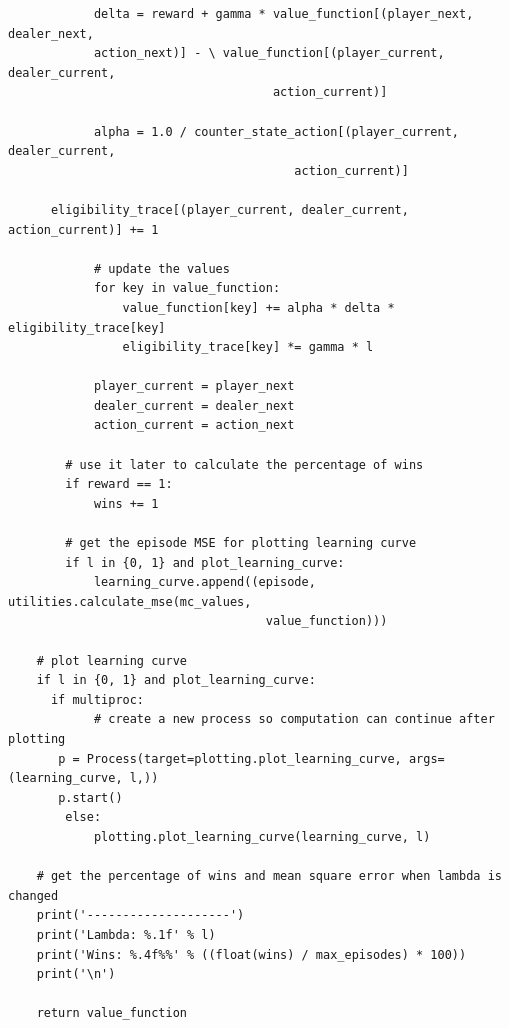 \documentclass[11pt]{article}
\theoremstyle{plain}
\theoremstyle{definition}
\begin{document}
\begin{lstlisting}
            delta = reward + gamma * value_function[(player_next, dealer_next, 
            action_next)] - \ value_function[(player_current, dealer_current,
            						 action_current)]

            alpha = 1.0 / counter_state_action[(player_current, dealer_current,
            						 	action_current)]

      eligibility_trace[(player_current, dealer_current, action_current)] += 1

            # update the values
            for key in value_function:
                value_function[key] += alpha * delta * eligibility_trace[key]
                eligibility_trace[key] *= gamma * l

            player_current = player_next
            dealer_current = dealer_next
            action_current = action_next

        # use it later to calculate the percentage of wins
        if reward == 1:
            wins += 1

        # get the episode MSE for plotting learning curve
        if l in {0, 1} and plot_learning_curve:
            learning_curve.append((episode, utilities.calculate_mse(mc_values, 
            						value_function)))

    # plot learning curve
    if l in {0, 1} and plot_learning_curve:
      if multiproc:
            # create a new process so computation can continue after plotting
       p = Process(target=plotting.plot_learning_curve, args=(learning_curve, l,))
       p.start()
        else:
            plotting.plot_learning_curve(learning_curve, l)

    # get the percentage of wins and mean square error when lambda is changed
    print('--------------------')
    print('Lambda: %.1f' % l)
    print('Wins: %.4f%%' % ((float(wins) / max_episodes) * 100))
    print('\n')

    return value_function
\end{lstlisting}
\newpage
\end{document}
